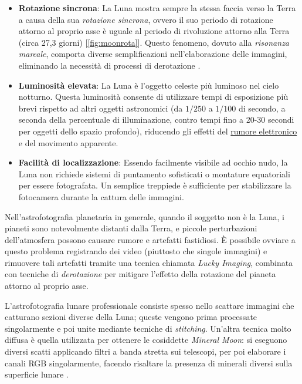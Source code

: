\begin{itemize}
    \item \textbf{Rotazione sincrona}: La Luna mostra sempre la stessa faccia verso la Terra a causa della sua \textit{rotazione sincrona}, ovvero il suo periodo di rotazione attorno al proprio asse è uguale al periodo di rivoluzione attorno alla Terra (circa 27,3 giorni) [\cref{fig:moonrota}]. Questo fenomeno, dovuto alla \textit{risonanza mareale}, comporta diverse semplificazioni nell'elaborazione delle immagini, eliminando la necessità di processi di derotazione \cite{nasa_moon_orbit}.
    
    \item \textbf{Luminosità elevata}: La Luna è l'oggetto celeste più luminoso nel cielo notturno. Questa luminosità consente di utilizzare tempi di esposizione più brevi rispetto ad altri oggetti astronomici (da $1/250$ a $1/100$ di secondo, a seconda della percentuale di illuminazione, contro tempi fino a $20$-$30$ secondi per oggetti dello spazio profondo), riducendo gli effetti del \hyperref[sec:noise]{rumore elettronico} e del movimento apparente.
    
    \item \textbf{Facilità di localizzazione}: Essendo facilmente visibile ad occhio nudo, la Luna non richiede sistemi di puntamento sofisticati o montature equatoriali per essere fotografata. Un semplice treppiede è sufficiente per stabilizzare la fotocamera durante la cattura delle immagini.
\end{itemize}

Nell'astrofotografia planetaria in generale, quando il soggetto non è la Luna, i pianeti sono notevolmente distanti dalla Terra, e piccole perturbazioni dell'atmosfera possono causare rumore e artefatti fastidiosi. È possibile ovviare a questo problema registrando dei video (piuttosto che singole immagini) e rimuovere tali artefatti tramite una tecnica chiamata \textit{Lucky Imaging}, combinata con tecniche di \textit{derotazione} per mitigare l'effetto della rotazione del pianeta attorno al proprio asse.

L'astrofotografia lunare professionale consiste spesso nello scattare immagini che catturano sezioni diverse della Luna; queste vengono prima processate singolarmente e poi unite mediante tecniche di \textit{stitching}. Un'altra tecnica molto diffusa è quella utilizzata per ottenere le cosiddette \textit{Mineral Moon}: si eseguono diversi scatti applicando filtri a banda stretta sui telescopi, per poi elaborare i canali RGB singolarmente, facendo risaltare la presenza di minerali diversi sulla superficie lunare \cite{legault_astrophoto}.

